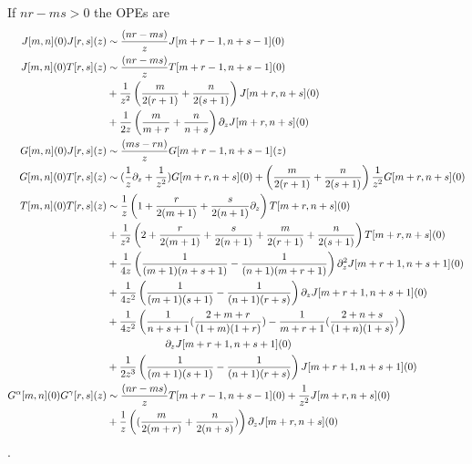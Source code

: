 \documentclass[../main.tex]{subfiles}
\begin{document}
If $nr-ms > 0$ the OPEs are
\begin{align}
J[m,n](0)J[r, s](z) &\sim {(nr-ms) \over z}J[m + r -1, n + s -1](0) \\
J[m, n](0)T[r, s](z) &\sim {(nr-ms) \over z}T[m + r -1, n + s -1](0) \\ \nonumber &+ {1 \over z^2}\left({m \over 2(r + 1)} + {n \over 2(s + 1)}\right)J[m + r, n + s](0) \\ \nonumber
&+{1 \over 2 z}\left({m \over m + r} + {n \over n + s} \right)\partial_z J[m + r, n + s](0)\\
G[m, n](0)J[r, s](z) &\sim {(ms - rn) \over z}G[m + r -1, n + s - 1](z) \\
G[m, n](0)T[r, s](z) &\sim ({1 \over z} \partial_z + {1 \over z^2})G[m + r, n+s](0) + \left({m \over 2(r+1)} + {n \over 2 (s + 1)}\right){1 \over z^2}G[m + r, n+s](0) \\
T[m, n](0)T[r, s](z) &\sim {1 \over z}\left(1 + {r \over 2(m+1)} + {s \over 2(n+1)}\partial_z \right) T[m + r, n +s](0) \\ \nonumber &+ {1 \over z^2}\left(2 + {r \over 2(m+1)} + {s \over 2(n+1)} + {m \over 2(r+1)} + {n \over 2(s+1)} \right)T[m + r, n + s](0)\\ \nonumber
&+{1 \over 4 z}\left({1 \over (m + 1)(n + s + 1)}- {1 \over (n +1)(m + r + 1)} \right) \partial^2_z J[m + r  +1, n + s +1](0) \\ \nonumber
&+{1 \over 4 z^2}\left({1 \over (m + 1)(s + 1)}- {1 \over (n+1)(r + s)}\right)\partial_z J[m + r + 1, n + s + 1](0) \\ \nonumber 
&+ {1 \over 4 z^2}\left({1 \over n + s + 1}({2 + m + r \over (1 + m)(1 + r)}) - {1 \over m + r + 1}({2 + n + s \over (1 + n)(1 + s)}) \right) \\ \nonumber & \ \ \ \ \ \ \ \ \ \ \ \ \ \ \ \ \ \partial_z J[m + r + 1, n + s + 1](0) \\ \nonumber
&+{1 \over 2 z^3}\left( {1 \over (m + 1)(s + 1)}- {1 \over (n+1)(r + s)}\right) J[m + r + 1, n + s + 1](0) \\ \nonumber
G^{\alpha}[m, n](0)G^{\gamma}[r, s](z) &\sim {(nr-ms) \over z}T[m + r -1, n + s -1](0) + {1 \over z^2}J[m + r, n + s](0) \\ \nonumber
&+{1 \over z}\left(({m \over 2 (m + r)} + {n \over 2 (n + s)})\right)\partial_z J[m + r, n+s](0)
\end{align}. 
\end{document}
